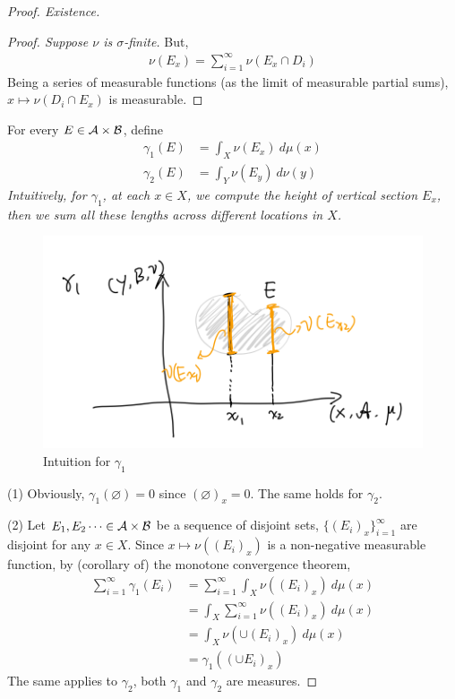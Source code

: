 \documentclass[11pt]{article}
\newcommand{\dmu}[0]{\ d\mu}
\begin{document}
\begin{theorem}
\begin{proof}[Proof. Existence]
\begin{proposition}
\begin{proof}[Proof. Suppose $\nu$ is $\sigma$-finite]
					But,
					\begin{align}
						\nu(E_x) = \sum_{i=1}^\infty \nu(E_x \cap D_i)
					\end{align}
					Being a series of measurable functions (as the limit of measurable partial sums), $x \mapsto \nu(D_i \cap E_x)$ is measurable.
				\end{proof}
			\end{proposition}
			For every $E \in \mathcal{{A}} \times \mathcal{{B}}$, define
			{\color{red}\begin{align}
				\gamma_1(E) &= \int_X \nu(E_x)\dmu(x) \\
				\gamma_2(E) &= \int_Y \nu(E_y)\ d\nu(y)
			\end{align}}
			\emph{Intuitively, for $\gamma_1$, at each $x \in X$, we compute the height of vertical section $E_x$, then we sum all these lengths across different locations in $X$.}
			\begin{figure}[h]
				\caption{Intuition for $\gamma_1$}
				\centering
				\includegraphics[width=0.6\linewidth]{product_measure.png}
			\end{figure}
			
			(1) Obviously, $\gamma_1(\varnothing) = 0$ since $(\varnothing)_x = 0$. The same holds for $\gamma_2$.
			
			(2) Let $E_1, E_2 \dots \in \mathcal{{A}} \times \mathcal{{B}}$ be a sequence of disjoint sets, $\{(E_i)_x\}_{i=1}^\infty$ are disjoint for any $x \in X$.
			Since $x \mapsto \nu((E_i)_x)$ is a non-negative measurable function, by (corollary of) the monotone convergence theorem,
			\begin{align}
				\sum_{i=1}^\infty \gamma_1(E_i) &= \sum_{i=1}^\infty \int_X \nu((E_i)_x)\dmu(x) \\
				&= \int_X \sum_{i=1}^\infty \nu((E_i)_x)\dmu(x) \\
				&= \int_X \nu (\cup (E_i)_x)\dmu(x) \\
				&= \gamma_1((\cup E_i)_x)
			\end{align}
			The same applies to $\gamma_2$, both $\gamma_1$ and $\gamma_2$ are measures.
			

\end{proof}
\end{theorem}
\end{document}
